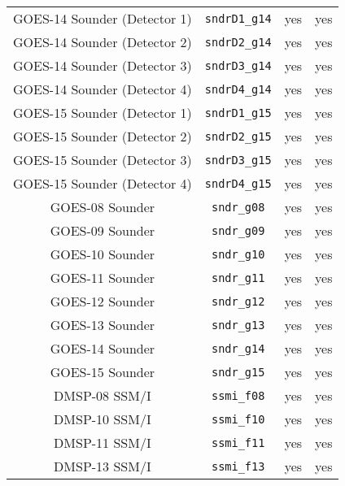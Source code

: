 \begin{center}
\begin{longtable}{c c c c}
  GOES-14 Sounder (Detector 1)       & \texttt{sndrD1\_g14}         &  yes     &  yes       \\
  GOES-14 Sounder (Detector 2)       & \texttt{sndrD2\_g14}         &  yes     &  yes       \\
  GOES-14 Sounder (Detector 3)       & \texttt{sndrD3\_g14}         &  yes     &  yes       \\
  GOES-14 Sounder (Detector 4)       & \texttt{sndrD4\_g14}         &  yes     &  yes       \\
  GOES-15 Sounder (Detector 1)       & \texttt{sndrD1\_g15}         &  yes     &  yes       \\
  GOES-15 Sounder (Detector 2)       & \texttt{sndrD2\_g15}         &  yes     &  yes       \\
  GOES-15 Sounder (Detector 3)       & \texttt{sndrD3\_g15}         &  yes     &  yes       \\
  GOES-15 Sounder (Detector 4)       & \texttt{sndrD4\_g15}         &  yes     &  yes       \\
  GOES-08 Sounder                    & \texttt{sndr\_g08}           &  yes     &  yes       \\
  GOES-09 Sounder                    & \texttt{sndr\_g09}           &  yes     &  yes       \\
  GOES-10 Sounder                    & \texttt{sndr\_g10}           &  yes     &  yes       \\
  GOES-11 Sounder                    & \texttt{sndr\_g11}           &  yes     &  yes       \\
  GOES-12 Sounder                    & \texttt{sndr\_g12}           &  yes     &  yes       \\
  GOES-13 Sounder                    & \texttt{sndr\_g13}           &  yes     &  yes       \\
  GOES-14 Sounder                    & \texttt{sndr\_g14}           &  yes     &  yes       \\
  GOES-15 Sounder                    & \texttt{sndr\_g15}           &  yes     &  yes       \\
  DMSP-08 SSM/I                      & \texttt{ssmi\_f08}           &  yes     &  yes       \\
  DMSP-10 SSM/I                      & \texttt{ssmi\_f10}           &  yes     &  yes       \\
  DMSP-11 SSM/I                      & \texttt{ssmi\_f11}           &  yes     &  yes       \\
  DMSP-13 SSM/I                      & \texttt{ssmi\_f13}           &  yes     &  yes       \\

\end{longtable}
\end{center}
